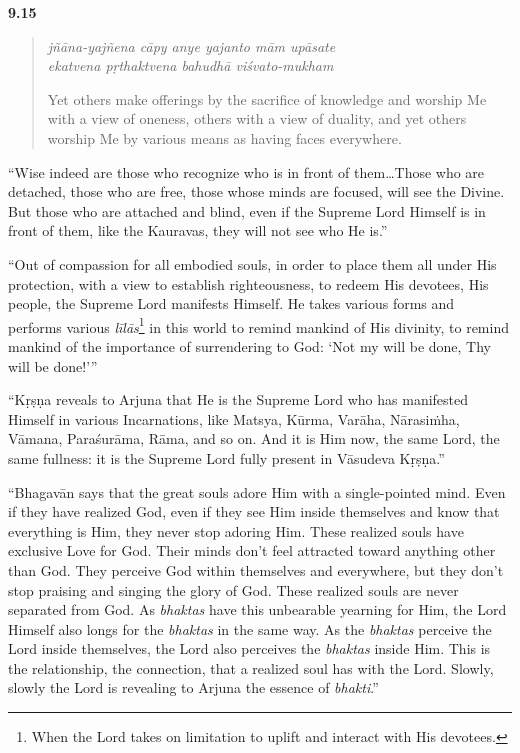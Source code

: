 \par\noindent\textbf{9.15}\par
\begin{verse}
\textit{jñāna-yajñena cāpy anye yajanto mām upāsate} \\
\textit{ekatvena pṛthaktvena bahudhā viśvato-mukham}

\noindent Yet others make offerings by the sacrifice of knowledge and worship Me with a view of oneness, others with a view of duality, and yet others worship Me by various means as having faces everywhere.
\end{verse}
\par


\enquote{Wise indeed are those who recognize who is in front of them\ldots Those who are detached, those who are free, those whose minds are focused, will see the Divine. But those who are attached and blind, even if the Supreme Lord Himself is in front of them, like the Kauravas, they will not see who He is.}

\enquote{Out of compassion for all embodied souls, in order to place them all under His protection, with a view to establish righteousness, to redeem His devotees, His people, the Supreme Lord manifests Himself. He takes various forms and performs various \textit{līlās}\footnote{When the Lord takes on limitation to uplift and interact with His devotees.} in this world to remind mankind of His divinity, to remind mankind of the importance of surrendering to God: \enquote{Not my will be done, Thy will be done!}}

\enquote{Kṛṣṇa reveals to Arjuna that He is the Supreme Lord who has manifested Himself in various Incarnations, like Matsya, Kūrma, Varāha, Nārasiṁha, Vāmana, Paraśurāma, Rāma, and so on. And it is Him now, the same Lord, the same fullness: it is the Supreme Lord fully present in Vāsudeva Kṛṣṇa.}

\enquote{Bhagavān says that the great souls adore Him with a single-pointed mind. Even if they have realized God, even if they see Him inside themselves and know that everything is Him, they never stop adoring Him. These realized souls have exclusive Love for God. Their minds don’t feel attracted toward anything other than God. They perceive God within themselves and everywhere, but they don’t stop praising and singing the glory of God. These realized souls are never separated from God. As \textit{bhaktas} have this unbearable yearning for Him, the Lord Himself also longs for the \textit{bhaktas} in the same way. As the \textit{bhaktas} perceive the Lord inside themselves, the Lord also perceives the \textit{bhaktas} inside Him. This is the relationship, the connection, that a realized soul has with the Lord. Slowly, slowly the Lord is revealing to Arjuna the essence of \textit{bhakti}.}

